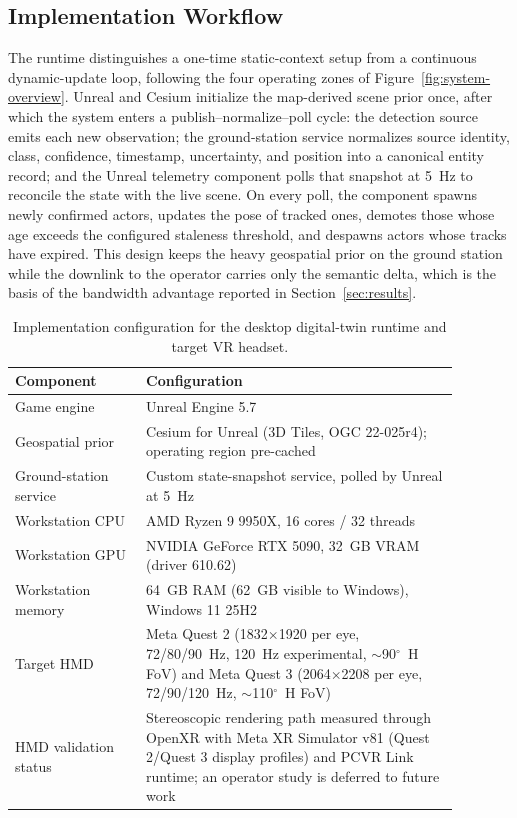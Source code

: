 \documentclass[fleqn]{VRIH2025}
\begin{document}
\subsection{Implementation Workflow}
\label{sec:workflow}
The runtime distinguishes a one-time static-context setup from a continuous dynamic-update loop, following the four operating zones of Figure~\ref{fig:system-overview}. Unreal and Cesium initialize the map-derived scene prior once, after which the system enters a publish--normalize--poll cycle: the detection source emits each new observation; the ground-station service normalizes source identity, class, confidence, timestamp, uncertainty, and position into a canonical entity record; and the Unreal telemetry component polls that snapshot at 5~Hz to reconcile the state with the live scene. On every poll, the component spawns newly confirmed actors, updates the pose of tracked ones, demotes those whose age exceeds the configured staleness threshold, and despawns actors whose tracks have expired. This design keeps the heavy geospatial prior on the ground station while the downlink to the operator carries only the semantic delta, which is the basis of the bandwidth advantage reported in Section~\ref{sec:results}.

\begin{table}[H]
\centering
\small
\caption{Implementation configuration for the desktop digital-twin runtime and target VR headset.}
\label{tab:implementation-config}
\begin{tabular}{@{}L{0.26\linewidth}L{0.62\linewidth}@{}}
\toprule
Component & Configuration \\
\midrule
Game engine & Unreal Engine 5.7 \\
Geospatial prior & Cesium for Unreal (3D Tiles, OGC 22-025r4); operating region pre-cached \\
Ground-station service & Custom state-snapshot service, polled by Unreal at 5~Hz \\
Workstation CPU & AMD Ryzen 9 9950X, 16 cores / 32 threads \\
Workstation GPU & NVIDIA GeForce RTX 5090, 32~GB VRAM (driver 610.62) \\
Workstation memory & 64~GB RAM (62~GB visible to Windows), Windows 11 25H2 \\
Target HMD & Meta Quest 2 (1832$\times$1920 per eye, 72/80/90~Hz, 120~Hz experimental, $\sim$90$^\circ$~H FoV) and Meta Quest 3 (2064$\times$2208 per eye, 72/90/120~Hz, $\sim$110$^\circ$~H FoV) \\
HMD validation status & Stereoscopic rendering path measured through OpenXR with Meta XR Simulator v81 (Quest 2/Quest 3 display profiles) and PCVR Link runtime; an operator study is deferred to future work \\
\bottomrule
\end{tabular}
\normalsize
\end{table}
\end{document}
